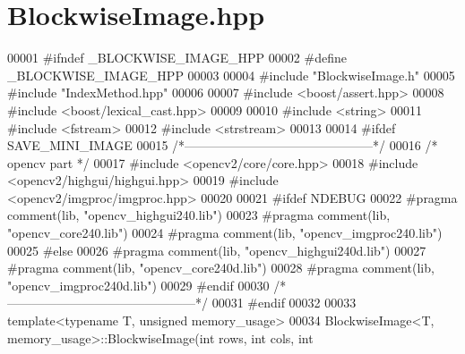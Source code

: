 \section{Blockwise\-Image.\-hpp}
\label{_blockwise_image_8hpp}

\begin{DoxyCode}
00001 \textcolor{preprocessor}{#ifndef \_BLOCKWISE\_IMAGE\_HPP}
00002 \textcolor{preprocessor}{}\textcolor{preprocessor}{#define \_BLOCKWISE\_IMAGE\_HPP}
00003 \textcolor{preprocessor}{}
00004 \textcolor{preprocessor}{#include "BlockwiseImage.h"}
00005 \textcolor{preprocessor}{#include "IndexMethod.hpp"}
00006 
00007 \textcolor{preprocessor}{#include <boost/assert.hpp>}
00008 \textcolor{preprocessor}{#include <boost/lexical\_cast.hpp>}
00009 
00010 \textcolor{preprocessor}{#include <string>}
00011 \textcolor{preprocessor}{#include <fstream>}
00012 \textcolor{preprocessor}{#include <strstream>}
00013 
00014 \textcolor{preprocessor}{#ifdef SAVE\_MINI\_IMAGE}
00015 \textcolor{preprocessor}{}\textcolor{comment}{/*---------------------------------------------*/}
00016 \textcolor{comment}{/* opencv part */}
00017 \textcolor{preprocessor}{#include <opencv2/core/core.hpp>}
00018 \textcolor{preprocessor}{#include <opencv2/highgui/highgui.hpp>}
00019 \textcolor{preprocessor}{#include <opencv2/imgproc/imgproc.hpp>}
00020 
00021 \textcolor{preprocessor}{#ifdef NDEBUG}
00022 \textcolor{preprocessor}{}\textcolor{preprocessor}{#pragma comment(lib, "opencv\_highgui240.lib")}
00023 \textcolor{preprocessor}{}\textcolor{preprocessor}{#pragma comment(lib, "opencv\_core240.lib")}
00024 \textcolor{preprocessor}{}\textcolor{preprocessor}{#pragma comment(lib, "opencv\_imgproc240.lib")}
00025 \textcolor{preprocessor}{}\textcolor{preprocessor}{#else}
00026 \textcolor{preprocessor}{}\textcolor{preprocessor}{#pragma comment(lib, "opencv\_highgui240d.lib")}
00027 \textcolor{preprocessor}{}\textcolor{preprocessor}{#pragma comment(lib, "opencv\_core240d.lib")}
00028 \textcolor{preprocessor}{}\textcolor{preprocessor}{#pragma comment(lib, "opencv\_imgproc240d.lib")}
00029 \textcolor{preprocessor}{}\textcolor{preprocessor}{#endif}
00030 \textcolor{preprocessor}{}\textcolor{comment}{/*---------------------------------------------*/}
00031 \textcolor{preprocessor}{#endif}
00032 \textcolor{preprocessor}{}
00033 \textcolor{keyword}{template}<\textcolor{keyword}{typename} T, \textcolor{keywordtype}{unsigned} memory\_usage>
00034 BlockwiseImage<T, memory_usage>::BlockwiseImage(\textcolor{keywordtype}{int} rows, \textcolor{keywordtype}{int} cols, \textcolor{keywordtype}{int} 

\end{DoxyCode}
